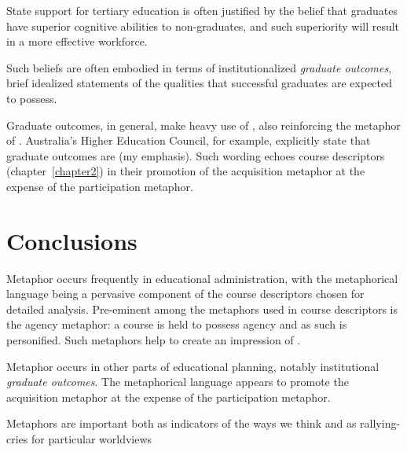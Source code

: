 State support for tertiary education is often justified by the belief
that graduates have superior cognitive abilities to non-graduates, and
such superiority will result in a more effective workforce.

Such beliefs are often embodied in terms of institutionalized
\emph{graduate outcomes}, brief idealized statements of the qualities
that successful graduates are expected to possess.

Graduate outcomes, in general, make heavy use of , also reinforcing the 
metaphor of .  Australia's Higher Education Council,
for example, explicitly state that graduate outcomes are  (my emphasis).  Such wording echoes course
descriptors (chapter~\ref{chapter2}) in their promotion of the
acquisition metaphor at the expense of the participation metaphor.

\section{Conclusions}

Metaphor occurs frequently in educational administration, with the
metaphorical language being a pervasive component of the course
descriptors chosen for detailed analysis.  Pre-eminent among the
metaphors used in course descriptors is the agency metaphor: a course
is held to possess agency and as such is personified.  Such metaphors
help to create an impression of .

Metaphor occurs in other parts of educational planning, notably
institutional \emph{graduate outcomes}.  The metaphorical language
appears to promote the acquisition metaphor at the expense of the
participation metaphor.


\begin{singlespace}
\epigraph{Metaphors are important both as indicators of the ways we
  think and as rallying-cries for particular
  worldviews}{}
\end{singlespace}
